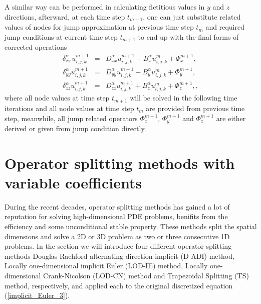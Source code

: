 \documentclass[dissertation]{uathesis}
\begin{document}
\begin{body}
A similar way can be performed in calculating fictitious values in $y$ and $z$ directions, afterward, at each time step $t_{m+1}$, one can just substitute related values of nodes for jump approximation at previous time step $t_m$ and required jump conditions at current time step $t_{m+1}$ to end up with the final forms of corrected operations 
%
\begin{eqnarray} 
\delta^{\alpha}_{xx} u^{m+1}_{i,j,k} &=& D^{\alpha}_{xx} u^{m+1}_{i,j,k} + B^{\alpha}_{x} u^{m}_{i,j,k} + \Phi_{x}^{m+1}, \label{delta_xx_operator_3} \\ 
\delta^{\alpha}_{yy} u^{m+1}_{i,j,k} &=& D^{\alpha}_{yy} u^{m+1}_{i,j,k} + B^{\alpha}_{y} u^{m}_{i,j,k} + \Phi_{y}^{m+1}, \label{delta_yy_operator_3} \\
\delta^{\alpha}_{zz} u^{m+1}_{i,j,k} &=& D^{\alpha}_{zz} u^{m+1}_{i,j,k} + B^{\alpha}_{z} u^{m}_{i,j,k} + \Phi_{z}^{m+1}, \label{delta_zz_operator_3},
\end{eqnarray}
%
where all node values at time step $t_{m+1}$ will be solved in the following time iterations and all node values at time step $t_m$ are provided from previous time step, meanwhile, all jump related operators $\Phi_{x}^{m+1}$, $\Phi_{y}^{m+1}$ and $\Phi_{z}^{m+1}$ are either derived or given from jump condition directly.

\section{Operator splitting methods with variable coefficients}
During the recent decades, operator splitting methods has gained a lot of reputation for solving high-dimensional PDE problems, benifits from the efficiency and some unconditional stable property. These methods split the spatial dimensions and solve a 2D or 3D problem as two or three consecutive 1D problems. In the section we will introduce four different operator splitting methods Douglas-Rachford alternating direction implicit (D-ADI) method, Locally one-dimensional implicit Euler (LOD-IE) method, Locally one-dimensional Crank-Nicolson (LOD-CN) method and Trapezoidal Splitting (TS) method, respectively, and applied each to the original discretized equation (\ref{implicit_Euler_3}).


\end{body}
\end{document}
